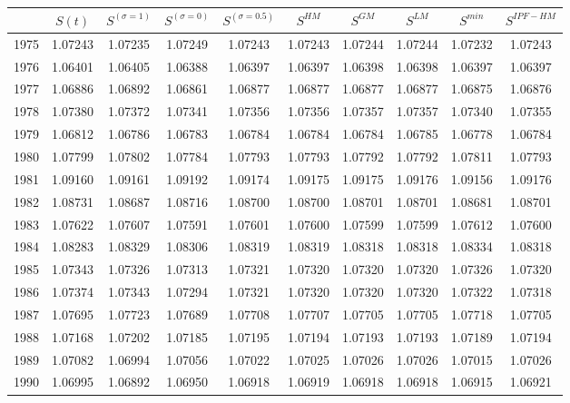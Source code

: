 \begin{tabular}{cccccccccc}
  \hline
 & $S(t)$ & $S^{(\sigma = 1)}$ & $S^{(\sigma = 0)}$ & $S^{(\sigma = 0.5)}$ & $S^{HM}$ & $S^{GM}$ & $S^{LM}$ & $S^{min}$ & $S^{IPF-HM}$ \\ 
  \hline
1975 & 1.07243 & 1.07235 & 1.07249 & 1.07243 & 1.07243 & 1.07244 & 1.07244 & 1.07232 & 1.07243 \\ 
  1976 & 1.06401 & 1.06405 & 1.06388 & 1.06397 & 1.06397 & 1.06398 & 1.06398 & 1.06397 & 1.06397 \\ 
  1977 & 1.06886 & 1.06892 & 1.06861 & 1.06877 & 1.06877 & 1.06877 & 1.06877 & 1.06875 & 1.06876 \\ 
  1978 & 1.07380 & 1.07372 & 1.07341 & 1.07356 & 1.07356 & 1.07357 & 1.07357 & 1.07340 & 1.07355 \\ 
  1979 & 1.06812 & 1.06786 & 1.06783 & 1.06784 & 1.06784 & 1.06784 & 1.06785 & 1.06778 & 1.06784 \\ 
  1980 & 1.07799 & 1.07802 & 1.07784 & 1.07793 & 1.07793 & 1.07792 & 1.07792 & 1.07811 & 1.07793 \\ 
  1981 & 1.09160 & 1.09161 & 1.09192 & 1.09174 & 1.09175 & 1.09175 & 1.09176 & 1.09156 & 1.09176 \\ 
  1982 & 1.08731 & 1.08687 & 1.08716 & 1.08700 & 1.08700 & 1.08701 & 1.08701 & 1.08681 & 1.08701 \\ 
  1983 & 1.07622 & 1.07607 & 1.07591 & 1.07601 & 1.07600 & 1.07599 & 1.07599 & 1.07612 & 1.07600 \\ 
  1984 & 1.08283 & 1.08329 & 1.08306 & 1.08319 & 1.08319 & 1.08318 & 1.08318 & 1.08334 & 1.08318 \\ 
  1985 & 1.07343 & 1.07326 & 1.07313 & 1.07321 & 1.07320 & 1.07320 & 1.07320 & 1.07326 & 1.07320 \\ 
  1986 & 1.07374 & 1.07343 & 1.07294 & 1.07321 & 1.07320 & 1.07320 & 1.07320 & 1.07322 & 1.07318 \\ 
  1987 & 1.07695 & 1.07723 & 1.07689 & 1.07708 & 1.07707 & 1.07705 & 1.07705 & 1.07718 & 1.07705 \\ 
  1988 & 1.07168 & 1.07202 & 1.07185 & 1.07195 & 1.07194 & 1.07193 & 1.07193 & 1.07189 & 1.07194 \\ 
  1989 & 1.07082 & 1.06994 & 1.07056 & 1.07022 & 1.07025 & 1.07026 & 1.07026 & 1.07015 & 1.07026 \\ 
  1990 & 1.06995 & 1.06892 & 1.06950 & 1.06918 & 1.06919 & 1.06918 & 1.06918 & 1.06915 & 1.06921 \\ 

\end{tabular}
